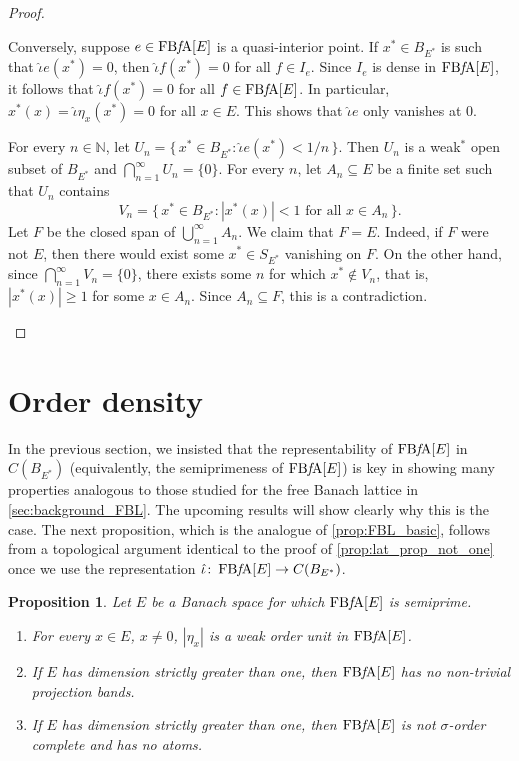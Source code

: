 \documentclass{memo-l}
\newtheorem{prop}[theorem]{Proposition}
\theoremstyle{definition}
\theoremstyle{remark}
\numberwithin{section}{chapter}
\numberwithin{equation}{chapter}
\newcommand\N{\ensuremath{\mathbb{N}}}
\newcommand{\FBFA}[1]{\operatorname{FB{\it f}\!A}[#1]}
\begin{document}
\begin{proof}
\begin{enumerate}
            Conversely, suppose $e \in \FBFA E$ is a quasi-interior
            point. If $x^{*}\in B_{E^{*}}$ is such that
            $\hat{\iota }e(x^{*})=0$, then $\hat{\iota }f(x^{*})=0$ for all $f
            \in I_e$. Since $I_e$ is dense in $\FBFA E$,
            it follows that $\hat{\iota }f(x^{*})=0$ for all
            $f \in \FBFA E$. In particular, $x^{*}(x)=\hat{\iota }\eta
            _x(x^{*})=0$ for all $x \in E$. This shows that $\hat{\iota }e$ only
            vanishes at $0$.

            For every $n \in \N$, let $U_n=\{\, x^{*}\in B_{E^{*}} :
            \hat{\iota }e(x^{*})<1/n \, \} $. Then $U_n$ is a weak$^*$ open
            subset of $B_{E^{*}}$ and $\bigcap_{n=1} ^{\infty
            }U_n=\{0\}$. For every $n$, let $A_n\subseteq E$ be a
            finite set such that $U_n$ contains
            \[
                V_n=\{\, x^{*}\in
                B_{E^{*}} : |x^{*}(x)|<1\text{ for all }x \in A_n \,
            \}.
            \]
            Let $F$ be the closed span of $\bigcup_{n=1}^{\infty } A_n
            $. We claim that $F=E$. Indeed, if $F$ were not $E$, then there
            would exist some $x^{*}\in S_{E^{*}}$ vanishing on $F$. On
            the other hand, since $\bigcap_{n=1} ^{\infty }V_n=\{0\}$, there
            exists some $n$ for which $x^{*}\not\in V_n$, that is,
            $|x^{*}(x)|\ge 1$ for some $x \in A_n$. Since $A_n
            \subseteq F$, this is a contradiction.\qedhere
    \end{enumerate}
\end{proof}

\section{Order density}

In the previous section, we insisted that the representability of
$\FBFA E$ in $C(B_{E^{*}})$ (equivalently, the semiprimeness of
$\FBFA E$) is key in showing many properties analogous to those
studied for the free Banach lattice in \cref{sec:background_FBL}.
The upcoming results will show clearly why this is the case. The
next proposition, which is the analogue of \cref{prop:FBL_basic},
follows from a topological argument identical to the proof of
\cref{prop:lat_prop_not_one} once we use the representation
$\hat{\iota }\colon \FBFA E\to C(B_{E^{*}})$.

\begin{prop}
    Let $E$ be a Banach space for which $\FBFA E$ is semiprime.
    \begin{enumerate}
        \item For every $x \in E$, $x\neq 0$, $|\eta _x|$ is a weak
            order unit in $\FBFA E$.
        \item If $E$ has dimension strictly greater than one, then $\FBFA E$
            has no non-trivial projection bands.
        \item If $E$ has dimension strictly greater than one, then $\FBFA E$
            is not $\sigma $-order complete and has no atoms.
    \end{enumerate}
\end{prop}
\end{document}
